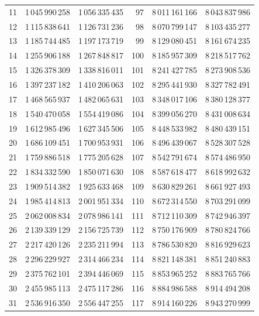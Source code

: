 \begin{longtable}{@{}r r r@{\qquad\qquad}r r r@{}}
11 & 1\,045\,990\,258 & 1\,056\,335\,435 & 97 & 8\,011\,161\,166 & 8\,043\,837\,986\\
12 & 1\,115\,838\,641 & 1\,126\,731\,236 & 98 & 8\,070\,799\,147 & 8\,103\,435\,277\\
13 & 1\,185\,744\,485 & 1\,197\,173\,719 & 99 & 8\,129\,080\,451 & 8\,161\,674\,235\\
14 & 1\,255\,906\,188 & 1\,267\,848\,817 & 100 & 8\,185\,957\,309 & 8\,218\,517\,762\\
15 & 1\,326\,378\,309 & 1\,338\,816\,011 & 101 & 8\,241\,427\,785 & 8\,273\,908\,536\\
16 & 1\,397\,237\,182 & 1\,410\,206\,063 & 102 & 8\,295\,441\,930 & 8\,327\,782\,491\\
17 & 1\,468\,565\,937 & 1\,482\,065\,631 & 103 & 8\,348\,017\,106 & 8\,380\,128\,377\\
18 & 1\,540\,470\,058 & 1\,554\,419\,086 & 104 & 8\,399\,056\,270 & 8\,431\,008\,634\\
19 & 1\,612\,985\,496 & 1\,627\,345\,506 & 105 & 8\,448\,533\,982 & 8\,480\,439\,151\\
20 & 1\,686\,109\,451 & 1\,700\,953\,931 & 106 & 8\,496\,439\,067 & 8\,528\,307\,528\\
21 & 1\,759\,886\,518 & 1\,775\,205\,628 & 107 & 8\,542\,791\,674 & 8\,574\,486\,950\\
22 & 1\,834\,332\,590 & 1\,850\,071\,630 & 108 & 8\,587\,618\,477 & 8\,618\,992\,632\\
23 & 1\,909\,514\,382 & 1\,925\,633\,468 & 109 & 8\,630\,829\,261 & 8\,661\,927\,493\\
24 & 1\,985\,414\,813 & 2\,001\,951\,334 & 110 & 8\,672\,314\,550 & 8\,703\,291\,099\\
25 & 2\,062\,008\,834 & 2\,078\,986\,141 & 111 & 8\,712\,110\,309 & 8\,742\,946\,397\\
26 & 2\,139\,339\,129 & 2\,156\,725\,739 & 112 & 8\,750\,176\,909 & 8\,780\,824\,766\\
27 & 2\,217\,420\,126 & 2\,235\,211\,994 & 113 & 8\,786\,530\,820 & 8\,816\,929\,623\\
28 & 2\,296\,229\,927 & 2\,314\,466\,234 & 114 & 8\,821\,148\,381 & 8\,851\,240\,883\\
29 & 2\,375\,762\,101 & 2\,394\,446\,069 & 115 & 8\,853\,965\,252 & 8\,883\,765\,766\\
30 & 2\,455\,985\,113 & 2\,475\,117\,286 & 116 & 8\,884\,986\,588 & 8\,914\,494\,208\\
31 & 2\,536\,916\,350 & 2\,556\,447\,255 & 117 & 8\,914\,160\,226 & 8\,943\,270\,999\\

\end{longtable}
